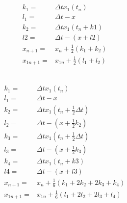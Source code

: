 \documentclass{article}
\begin{document}
        \subsection{}
            \begin{equation*}
                \begin{split}
                    k_1=&\Delta t x_1(t_n)\\
                    l_1=&\Delta t -x\\
                    k_2=&\Delta t x_1(t_n+k1)\\
                    l2=&\Delta t -(x+l2)\\
                    x_{n+1}=&x_n+\frac{1}{2}(k_1+k_2)\\
                    x_{1n+1}=&x_{1n}+\frac{1}{2}(l_1+l_2)\\
                \end{split}
            \end{equation*}
        \subsection{}
            \begin{equation*}
                \begin{split}
                    k_1=&\Delta t x_1(t_n)\\
                    l_1=&\Delta t -x\\
                    k_2=&\Delta t x_1(t_n+\frac{1}{2}\Delta t)\\
                    l_2=&\Delta t -(x+\frac{1}{2}k_2)\\
                    k_3=&\Delta t x_1(t_n+\frac{1}{2}\Delta t)\\
                    l_3=&\Delta t -(x+\frac{1}{2}k_3)\\
                    k_4=&\Delta t x_1(t_n+k3)\\
                    l4=&\Delta t -(x+l3)\\
                    x_{n+1}=&x_n+\frac{1}{6}(k_1+2k_2+2k_3+k_4)\\
                    x_{1n+1}=&x_{1n}+\frac{1}{6}(l_1+2l_2+2l_3+l_4)\\
                \end{split}
            \end{equation*}
\end{document}
